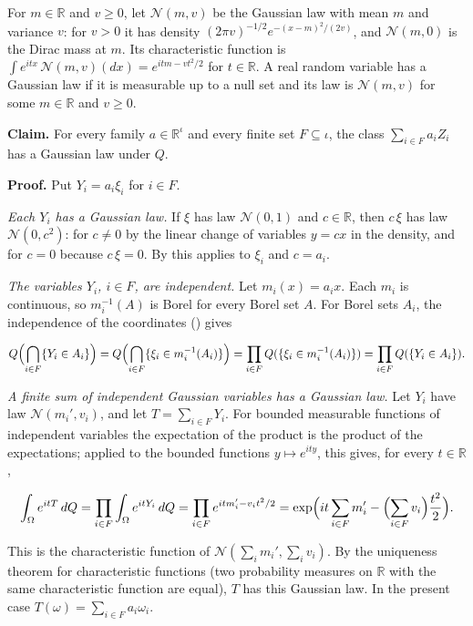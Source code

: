\documentclass[11pt,a4paper]{article}
\begin{document}
For \(m\in\mathbb R\) and \(v\ge0\), let \(\mathcal N(m,v)\) be the Gaussian law with mean \(m\) and variance \(v\): for \(v>0\) it has density \((2\pi v)^{-1/2}e^{-(x-m)^2/(2v)}\), and \(\mathcal N(m,0)\) is the Dirac mass at \(m\). Its characteristic function is \(\int e^{itx}\,\mathcal N(m,v)(dx)=e^{itm-vt^2/2}\) for \(t\in\mathbb R\). A real random variable has a Gaussian law if it is measurable up to a null set and its law is \(\mathcal N(m,v)\) for some \(m\in\mathbb R\) and \(v\ge0\).




\textbf{Claim.} For every family \(a\in\mathbb R^\iota\) and every finite set \(F\subseteq\iota\), the class \(\sum_{i\in F}a_iZ_i\) has a Gaussian law under \(Q\).




\textbf{Proof.} Put \(Y_i=a_i\xi_i\) for \(i\in F\).




\emph{Each \(Y_i\) has a Gaussian law.} If \(\xi\) has law \(\mathcal N(0,1)\) and \(c\in\mathbb R\), then \(c\,\xi\) has law \(\mathcal N(0,c^2)\): for \(c\ne0\) by the linear change of variables \(y=cx\) in the density, and for \(c=0\) because \(c\,\xi=0\). By \cite[Section~3.6.3]{LangevinLean2026ULASC} this applies to \(\xi_i\) and \(c=a_i\).




\emph{The variables \(Y_i\), \(i\in F\), are independent.} Let \(m_i(x)=a_ix\). Each \(m_i\) is continuous, so \(m_i^{-1}(A)\) is Borel for every Borel set \(A\). For Borel sets \(A_i\), the independence of the coordinates (\cite[Section~3.6.6]{LangevinLean2026ULASC}) gives


\[Q\Bigl(\bigcap_{i\in F}\{Y_i\in A_i\}\Bigr)=Q\Bigl(\bigcap_{i\in F}\{\xi_i\in m_i^{-1}(A_i)\}\Bigr)=\prod_{i\in F}Q(\{\xi_i\in m_i^{-1}(A_i)\})=\prod_{i\in F}Q(\{Y_i\in A_i\}).\]


\emph{A finite sum of independent Gaussian variables has a Gaussian law.} Let \(Y_i\) have law \(\mathcal N(m_i',v_i)\), and let \(T=\sum_{i\in F}Y_i\). For bounded measurable functions of independent variables the expectation of the product is the product of the expectations; applied to the bounded functions \(y\mapsto e^{ity}\), this gives, for every \(t\in\mathbb R\),


\[\int_\Omega e^{itT}\,dQ=\prod_{i\in F}\int_\Omega e^{itY_i}\,dQ=\prod_{i\in F}e^{itm_i'-v_it^2/2}=\exp\Bigl(it\sum_{i\in F}m_i'-\Bigl(\sum_{i\in F}v_i\Bigr)\frac{t^2}2\Bigr).\]


This is the characteristic function of \(\mathcal N(\sum_im_i',\sum_iv_i)\). By the uniqueness theorem for characteristic functions (two probability measures on \(\mathbb R\) with the same characteristic function are equal), \(T\) has this Gaussian law. In the present case \(T(\omega)=\sum_{i\in F}a_i\omega_i\).
\end{document}

